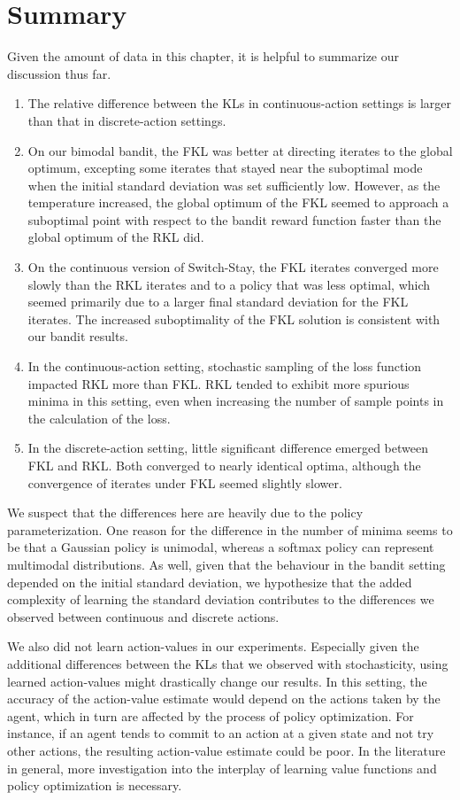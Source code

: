 \documentclass[\main/thesis.tex]{subfiles}
\begin{document}
\section{Summary}
Given the amount of data in this chapter, it is helpful to summarize our discussion thus far. 
\begin{enumerate}
    \item The relative difference between the KLs in continuous-action settings is larger than that in discrete-action settings. 
    \item On our bimodal bandit, the FKL was better at directing iterates to the global optimum, excepting some iterates that stayed near the suboptimal mode when the initial standard deviation was set sufficiently low. However, as the temperature increased, the global optimum of the FKL seemed to approach a suboptimal point with respect to the bandit reward function faster than the global optimum of the RKL did. 
    \item On the continuous version of Switch-Stay, the FKL iterates converged more slowly than the RKL iterates and to a policy that was less optimal, which seemed primarily due to a larger final standard deviation for the FKL iterates. The increased suboptimality of the FKL solution is consistent with our bandit results. 
    \item In the continuous-action setting, stochastic sampling of the loss function impacted RKL more than FKL. RKL tended to exhibit more spurious minima in this setting, even when increasing the number of sample points in the calculation of the loss. 
    \item In the discrete-action setting, little significant difference emerged between FKL and RKL. Both converged to nearly identical optima, although the convergence of iterates under FKL seemed slightly slower. 
\end{enumerate}

We suspect that the differences here are heavily due to the policy parameterization. One reason for the difference in the number of minima seems to be that a Gaussian policy is unimodal, whereas a softmax policy can represent multimodal distributions. As well, given that the behaviour in the bandit setting depended on the initial standard deviation, we hypothesize that the added complexity of learning the standard deviation contributes to the differences we observed between continuous and discrete actions. 


We also did not learn action-values in our experiments. Especially given the additional differences between the KLs that we observed with stochasticity, using learned action-values might drastically change our results. In this setting, the accuracy of the action-value estimate would depend on the actions taken by the agent, which in turn are affected by the process of policy optimization. For instance, if an agent tends to commit to an action at a given state and not try other actions, the resulting action-value estimate could be poor. In the literature in general, more investigation into the interplay of learning value functions and policy optimization is necessary. 
\end{document}
